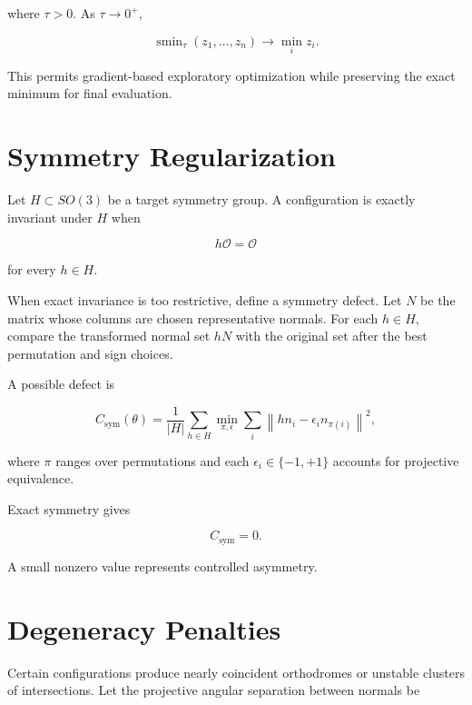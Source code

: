 \documentclass[11pt,fleqn]{book}
\numberwithin{equation}{chapter}
\theoremstyle{plain}
\theoremstyle{definition}
\theoremstyle{remark}
\newcommand{\Oset}{\mathcal{O}}
\begin{document}
where \(\tau>0\). As \(\tau\to 0^+\),

\begin{equation}
    \operatorname{smin}_{\tau}
    (z_1,\dots,z_n)
    \to
    \min_i z_i.
\end{equation}

This permits gradient-based exploratory optimization while preserving the exact minimum for final evaluation.

\section{Symmetry Regularization}

Let \(H\subset SO(3)\) be a target symmetry group. A configuration is exactly invariant under \(H\) when

\begin{equation}
    h\Oset=\Oset
\end{equation}

for every \(h\in H\).

When exact invariance is too restrictive, define a symmetry defect. Let \(N\) be the matrix whose columns are chosen representative normals. For each \(h\in H\), compare the transformed normal set \(hN\) with the original set after the best permutation and sign choices.

A possible defect is

\begin{equation}
    C_{\mathrm{sym}}(\theta)
    =
    \frac{1}{|H|}
    \sum_{h\in H}
    \min_{\pi,\epsilon}
    \sum_{i}
    \left\|
      hn_i
      -
      \epsilon_i n_{\pi(i)}
    \right\|^2,
\end{equation}

where \(\pi\) ranges over permutations and each \(\epsilon_i\in\{-1,+1\}\) accounts for projective equivalence.

Exact symmetry gives

\begin{equation}
    C_{\mathrm{sym}}=0.
\end{equation}

A small nonzero value represents controlled asymmetry.

\section{Degeneracy Penalties}

Certain configurations produce nearly coincident orthodromes or unstable clusters of intersections. Let the projective angular separation between normals be
\end{document}
